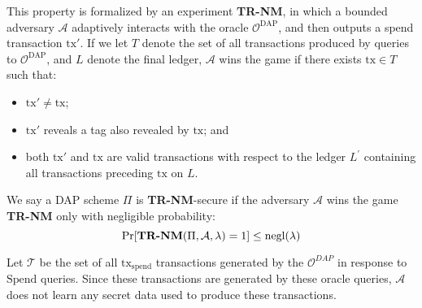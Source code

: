 \documentclass{llncs}
\begin{document}
This property is formalized by an experiment \textbf{TR-NM}, in which a bounded adversary $\mathcal{A}$ adaptively interacts with the oracle $\mathcal{O}^{\text{DAP}}$, and then outputs a spend transaction $\text{tx}'$.
If we let $T$ denote the set of all transactions produced by  queries to $\mathcal{O}^{\text{DAP}}$, and $L$ denote the final ledger, $\mathcal{A}$ wins the game if there exists $\text{tx} \in T$ such that:
\begin{itemize}
    \item $\text{tx}' \neq \text{tx}$; 
    \item $\text{tx}'$ reveals a tag also revealed by $\text{tx}$; and
    \item both $\text{tx}'$ and $\text{tx}$ are valid transactions with respect to the ledger $L^{\prime}$ containing all transactions preceding $\text{tx}$ on $L$.
\end{itemize}

We say a DAP scheme $\Pi$ is \textbf{TR-NM}-secure if the adversary $\mathcal{A}$ wins the game \textbf{TR-NM} only with negligible probability:
$$\text{Pr}[\text{\textbf{TR-NM}}(\Pi, \mathcal{A}, \lambda) = 1] \leq \text{negl}(\lambda)$$

Let $\mathcal{T}$ be the set of all $\text{tx}_{\text{spend}}$ transactions generated by the $\mathcal{O}^{DAP}$ in response to $\text{Spend}$ queries.
Since these transactions are generated by these oracle queries, $\mathcal{A}$ does not learn any secret data used to produce these transactions.
\end{document}
